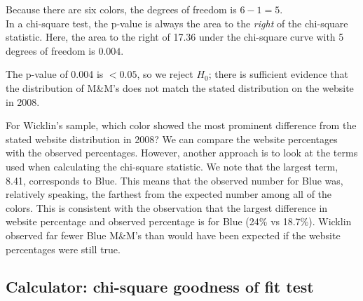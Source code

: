 \begin{examplewrap}
\begin{nexample}
\begin{description}
Because there are six colors, the degrees of freedom is $6-1=5$.
\\In a chi-square test, the p-value is always the area to the \emph{right} of the chi-square statistic.  Here, the area to the right of 17.36 under the chi-square curve with 5 degrees of freedom is $0.004$.  
\item[\inferencestep{Conclude}]  The p-value of 0.004 is $< 0.05$, so we reject $H_0$; there is sufficient evidence that the distribution of M\&M's does not match the stated distribution on the website in 2008.  
\end{description}
\end{nexample}
\end{examplewrap}

\begin{examplewrap}
\begin{nexample}
{For Wicklin's sample, which color showed the most prominent difference from the stated website distribution in 2008?}
We can compare the website percentages with the observed percentages.  However, another approach is to look at the terms used when calculating the chi-square statistic.  We note that the largest term, 8.41, corresponds to Blue.  This means that the observed number for Blue was, relatively speaking, the farthest from the expected number among all of the colors.  This is consistent with the observation that the largest difference in website percentage and observed percentage is for Blue (24\% vs 18.7\%).  Wicklin observed far fewer Blue M\&M's than would have been expected if the website percentages were still true.
\end{nexample}
\end{examplewrap}


\D{\newpage}

\subsection{Calculator: chi-square goodness of fit test}
\label{GOF}

